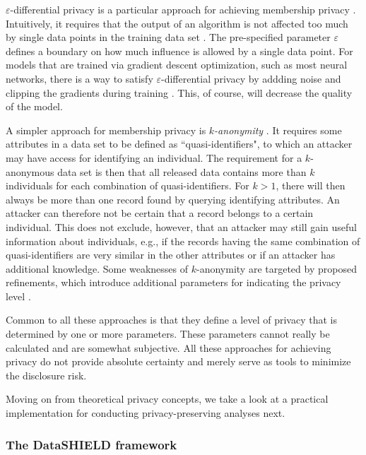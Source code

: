 \documentclass[12pt]{article}
\begin{document}
$\varepsilon$-differential privacy is a particular approach for achieving membership privacy \citep{dwork_differential_2008}.
Intuitively, it requires that the output of an algorithm is not affected too much by single data points in the training data set \citep{li_membership_2013}.
The pre-specified parameter $\varepsilon$ defines a boundary on how much influence is allowed by a single data point.
For models that are trained via gradient descent optimization, such as most neural networks, there is a way to satisfy $\varepsilon$-differential privacy by addding noise and clipping the gradients during training \citep{abadi_deep_2016}.
This, of course, will decrease the quality of the model.

A simpler approach for membership privacy is {\em $k$-anonymity} \citep{sweeney_k_anonymity_2012}.
It requires some attributes in a data set to be defined as ``quasi-identifiers", to which an attacker may have access for identifying an individual.
The requirement for a $k$-anonymous data set is then that all released data contains more than $k$ individuals for each combination of quasi-identifiers.
For $k > 1$, there will then always be more than one record found by querying identifying attributes.
An attacker can therefore not be certain that a record belongs to a certain individual.
This does not exclude, however, that an attacker may still gain useful information about individuals, e.g., if the records having the same combination of quasi-identifiers are very similar in the other attributes or if an attacker has additional knowledge.
Some weaknesses of $k$-anonymity are targeted by proposed refinements, which introduce additional parameters for indicating the privacy level \citep{machanavajjhala_l-diversity_2007, li_t-closeness:_2007}.

Common to all these approaches is that they define a level of privacy that is determined by one or more parameters.
These parameters cannot really be calculated and are somewhat subjective. All these approaches for achieving privacy do not provide absolute certainty and merely serve as tools to minimize the disclosure risk.
 
Moving on from theoretical privacy concepts, we take a look at a practical implementation for conducting privacy-preserving analyses next.

\subsubsection{The DataSHIELD framework}
\end{document}
